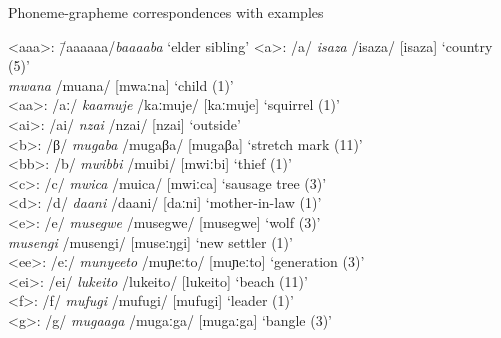 \ea Phoneme-grapheme correspondences with examples\label{tab-graphemes}
 \begin{tabbing}
 <aaa>: \= /aaaaaa/\= \textit{baaaaba} ‘elder sibling’\kill
<a>: \> /a/ \>  \textit{isaza} /isaza/ [isaza] ‘country (5)’\\
\> \>  \textit{mwana} /muana/ [mwaːna] ‘child (1)’\\
<aa>:  \>  /aː/ \>  \textit{kaamuje} /kaːmuje/ [kaːmuje] ‘squirrel (1)’\\
<ai>:  \>  /ai/  \>   \textit{nzai} /nzai/ [nzai] ‘outside’\\
<b>:  \>  /β/  \>   \textit{mugaba} /mugaβa/ [mugaβa] ‘stretch mark (11)’\\
<bb>:  \>  /b/  \>   \textit{mwibbi} /muibi/ [mwiːbi] ‘thief (1)’\\
<c>:  \>  /c/  \>   \textit{mwica} /muica/ [mwiːca] ‘sausage tree (3)’\\
<d>:  \>  /d/  \>   \textit{daani} /daani/ [daːni] ‘mother-in-law (1)’\\
<e>:  \>  /e/  \>   \textit{musegwe} /musegwe/ [musegwe] ‘wolf (3)’\\
	  \>	 \>  		 \textit{musengi} /musengi/ [museːŋgi] ‘new settler (1)’\\
<ee>:  \>  /eː/  \>   \textit{munyeeto} /muɲeːto/ [muɲeːto] ‘generation (3)’\\
<ei>:  \>  /ei/  \>   \textit{lukeito} /lukeito/ [lukeito] ‘beach (11)’\\
<f>:  \>  /f/  \>   \textit{mufugi} /mufugi/ [mufugi] ‘leader (1)’\\
<g>:  \>  /g/  \>   \textit{mugaaga} /mugaːga/ [mugaːga] ‘bangle (3)’\\


\end{tabbing}
